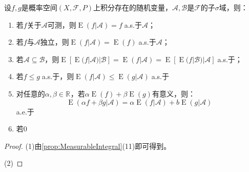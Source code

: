 \begin{theorem}
	设$f,g$是概率空间$(X,\mathscr{F},P)$上积分存在的随机变量，$\mathscr{A},\mathscr{B}$是$\mathscr{F}$的子$\sigma$域，则：
	\begin{enumerate}
		\item 若$f$关于$\mathscr{A}$可测，则$\operatorname{E}(f|\mathscr{A})=f\;$a.s.于$\mathscr{A}$；
		\item 若$f$与$\mathscr{A}$独立，则$\operatorname{E}(f|\mathscr{A})=\operatorname{E}(f)\;$a.s.于$\mathscr{A}$；
		\item 若$\mathscr{A}\subseteq\mathscr{B}$，则$\operatorname{E}[\operatorname{E}(f|\mathscr{A})|\mathscr{B}]=\operatorname{E}(f|\mathscr{A})=\operatorname{E}[\operatorname{E}(f|\mathscr{B})|\mathscr{A}]\;$a.s.于；
		\item 若$f\leqslant g\;$a.s.于，则$\operatorname{E}(f|\mathscr{A})\leqslant\operatorname{E}(g|\mathscr{A})\;$a.s.于
		\item 对任意的$\alpha,\beta\in\mathbb{R}^{}$，若$\alpha\operatorname{E}(f)+\beta\operatorname{E}(g)$有意义，则：
		\begin{equation*}
			\operatorname{E}(\alpha f+\beta g|\mathscr{A})=\alpha\operatorname{E}(f|\mathscr{A})+b\operatorname{E}(g|\mathscr{A})
		\end{equation*}
		a.e.于
		\item 若$0$
	\end{enumerate}
\end{theorem}
\begin{proof}
	(1)由\cref{prop:MeasurableIntegral}(11)即可得到。\par
	(2)
\end{proof}